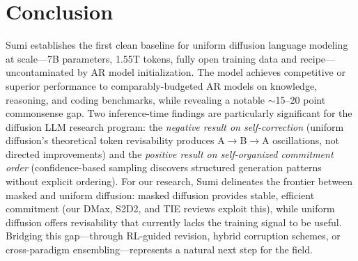 \documentclass[11pt,a4paper]{article}
\begin{document}
\section{Conclusion}

Sumi establishes the first clean baseline for uniform diffusion language modeling at scale---7B parameters, 1.55T tokens, fully open training data and recipe---uncontaminated by AR model initialization. The model achieves competitive or superior performance to comparably-budgeted AR models on knowledge, reasoning, and coding benchmarks, while revealing a notable $\sim$15--20 point commonsense gap. Two inference-time findings are particularly significant for the diffusion LLM research program: the \emph{negative result on self-correction} (uniform diffusion's theoretical token revisability produces A$\to$B$\to$A oscillations, not directed improvements) and the \emph{positive result on self-organized commitment order} (confidence-based sampling discovers structured generation patterns without explicit ordering). For our research, Sumi delineates the frontier between masked and uniform diffusion: masked diffusion provides stable, efficient commitment (our DMax, S2D2, and TIE reviews exploit this), while uniform diffusion offers revisability that currently lacks the training signal to be useful. Bridging this gap---through RL-guided revision, hybrid corruption schemes, or cross-paradigm ensembling---represents a natural next step for the field.
\end{document}

